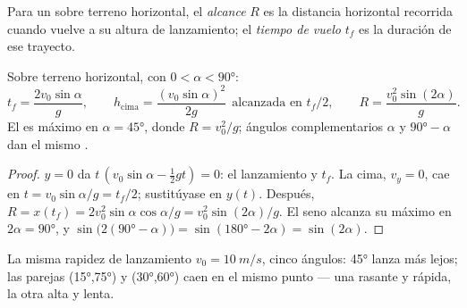 \begin{definition}[Alcance]\label{def:g12:projectile-motion:range}
Para un  sobre terreno horizontal, el \emph{alcance} $R$ es la
distancia horizontal recorrida cuando vuelve a su altura de lanzamiento; el
\emph{tiempo de vuelo} $t_f$ es la duración de ese trayecto.
\end{definition}

\begin{proposition}\label{prop:g12:projectile-motion:range}
Sobre terreno horizontal, con $0 < \alpha < \ang{90}$:
\[
t_f = \frac{2 v_0 \sin\alpha}{g}, \qquad
h_{\text{cima}} = \frac{(v_0\sin\alpha)^2}{2g}
\ \ \text{alcanzada en } t_f/2, \qquad
R = \frac{v_0^2 \sin(2\alpha)}{g}.
\]
El  es máximo en $\alpha = \ang{45}$, donde $R = v_0^2/g$; ángulos
complementarios $\alpha$ y $\ang{90} - \alpha$ dan el mismo .
\end{proposition}

\begin{proof}
$y = 0$ da $t\,(v_0\sin\alpha - \tfrac12 gt) = 0$: el lanzamiento y $t_f$. La cima,
$v_y = 0$, cae en $t = v_0\sin\alpha/g = t_f/2$; sustitúyase en $y(t)$. Después,
$R = x(t_f) = 2v_0^2\sin\alpha\cos\alpha/g = v_0^2\sin(2\alpha)/g$. El seno alcanza su
máximo en $2\alpha = \ang{90}$, y
$\sin\bigl(2(\ang{90}-\alpha)\bigr) = \sin(\ang{180} - 2\alpha) = \sin(2\alpha)$.
\end{proof}

\begin{omfigure}

{\small La misma rapidez de lanzamiento $v_0 = \qty{10}{m/s}$, cinco ángulos:
\ang{45} lanza más lejos; las parejas (\ang{15},\ang{75}) y (\ang{30},\ang{60}) caen
en el mismo punto --- una rasante y rápida, la otra alta y lenta.}
\end{omfigure}

